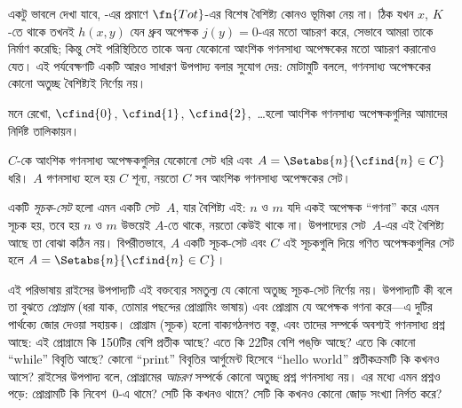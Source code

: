 \documentclass[../../../include/open-logic-section]{subfiles}
\begin{document}

একটু ভাবলে দেখা যাবে, -এর প্রমাণে $\fn{Tot}$-এর
বিশেষ বৈশিষ্ট্য কোনও ভূমিকা নেয় না। ঠিক যখন $x$, $K$-তে থাকে তখনই
$h(x,y)$ যেন ধ্রুব অপেক্ষক $j(y) = 0$-এর মতো আচরণ করে, সেভাবে আমরা তাকে
নির্মাণ করেছি; কিন্তু সেই পরিস্থিতিতে তাকে অন্য যেকোনো আংশিক গণনসাধ্য
অপেক্ষকের মতো আচরণ করানোও যেত। এই পর্যবেক্ষণটি একটি আরও সাধারণ উপপাদ্য
বলার সুযোগ দেয়: মোটামুটি বললে, গণনসাধ্য অপেক্ষকের কোনো অতুচ্ছ বৈশিষ্ট্যই
নির্ণেয় নয়।

মনে রেখো, $\cfind{0}$, $\cfind{1}$, $\cfind{2}$,~\dots হলো আংশিক
গণনসাধ্য অপেক্ষকগুলির আমাদের নির্দিষ্ট তালিকায়ন।

\begin{thm}[রাইসের উপপাদ্য]
  $C$-কে আংশিক গণনসাধ্য অপেক্ষকগুলির যেকোনো সেট ধরি এবং
  $A = \Setabs{n}{\cfind{n} \in C}$ ধরি। $A$ গণনসাধ্য হলে হয় $C$
  শূন্য, নয়তো $C$ সব আংশিক গণনসাধ্য অপেক্ষকের সেট।
\end{thm}

একটি \emph{সূচক-সেট} হলো এমন একটি সেট~$A$, যার বৈশিষ্ট্য এই: $n$ ও $m$
যদি একই অপেক্ষক “গণনা” করে এমন সূচক হয়, তবে হয় $n$ ও $m$ উভয়েই
$A$-তে থাকে, নয়তো কেউই থাকে না। উপপাদ্যের সেট~$A$-এর এই বৈশিষ্ট্য আছে
তা বোঝা কঠিন নয়। বিপরীতভাবে, $A$ একটি সূচক-সেট এবং $C$ এই সূচকগুলি
দিয়ে গণিত অপেক্ষকগুলির সেট হলে $A = \Setabs{n}{\cfind{n} \in C}$।

\begin{explain}
এই পরিভাষায় রাইসের উপপাদ্যটি এই বক্তব্যের সমতুল্য যে কোনো অতুচ্ছ
সূচক-সেট নির্ণেয় নয়। উপপাদ্যটি কী বলে তা বুঝতে \emph{প্রোগ্রাম}
(ধরা যাক, তোমার পছন্দের প্রোগ্রামিং ভাষায়) এবং প্রোগ্রাম যে অপেক্ষক
গণনা করে—এ দুটির পার্থক্যে জোর দেওয়া সহায়ক। প্রোগ্রাম (সূচক) হলো
বাক্যগঠনগত বস্তু, এবং তাদের সম্পর্কে অবশ্যই গণনসাধ্য প্রশ্ন আছে: এই
প্রোগ্রামে কি 150টির বেশি প্রতীক আছে? এতে কি 22টির বেশি পঙ্‌ক্তি আছে?
এতে কি কোনো “while” বিবৃতি আছে? কোনো “print” বিবৃতির আর্গুমেন্ট হিসেবে
“hello world” প্রতীকক্রমটি কি কখনও আসে? রাইসের উপপাদ্য বলে, প্রোগ্রামের
\emph{আচরণ} সম্পর্কে কোনো অতুচ্ছ প্রশ্ন গণনসাধ্য নয়। এর মধ্যে এমন
প্রশ্নও পড়ে: প্রোগ্রামটি কি নিবেশ~$0$-এ থামে? সেটি কি কখনও থামে? সেটি
কি কখনও কোনো জোড় সংখ্যা নির্গত করে?
\end{explain}
\end{document}

